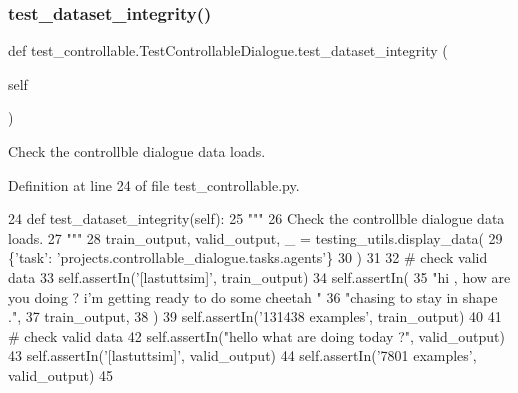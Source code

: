 \subsubsection{\texorpdfstring{test\+\_\+dataset\+\_\+integrity()}{test\_dataset\_integrity()}}
{\footnotesize\ttfamily def test\+\_\+controllable.\+Test\+Controllable\+Dialogue.\+test\+\_\+dataset\+\_\+integrity (\begin{DoxyParamCaption}\item[{}]{self }\end{DoxyParamCaption})}

\begin{DoxyVerb}Check the controllble dialogue data loads.
\end{DoxyVerb}
 

Definition at line 24 of file test\+\_\+controllable.\+py.


\begin{DoxyCode}
24     \textcolor{keyword}{def }test\_dataset\_integrity(self):
25         \textcolor{stringliteral}{"""}
26 \textcolor{stringliteral}{        Check the controllble dialogue data loads.}
27 \textcolor{stringliteral}{        """}
28         train\_output, valid\_output, \_ = testing\_utils.display\_data(
29             \{\textcolor{stringliteral}{'task'}: \textcolor{stringliteral}{'projects.controllable\_dialogue.tasks.agents'}\}
30         )
31 
32         \textcolor{comment}{# check valid data}
33         self.assertIn(\textcolor{stringliteral}{'[lastuttsim]'}, train\_output)
34         self.assertIn(
35             \textcolor{stringliteral}{"hi , how are you doing ? i'm getting ready to do some cheetah "}
36             \textcolor{stringliteral}{"chasing to stay in shape ."},
37             train\_output,
38         )
39         self.assertIn(\textcolor{stringliteral}{'131438 examples'}, train\_output)
40 
41         \textcolor{comment}{# check valid data}
42         self.assertIn(\textcolor{stringliteral}{"hello what are doing today ?"}, valid\_output)
43         self.assertIn(\textcolor{stringliteral}{'[lastuttsim]'}, valid\_output)
44         self.assertIn(\textcolor{stringliteral}{'7801 examples'}, valid\_output)
45 
\end{DoxyCode}
\mbox{\label{classtest__controllable_1_1TestControllableDialogue_ad46fe0ecf2f0b42e60424d1c7b37a2f5}} 
